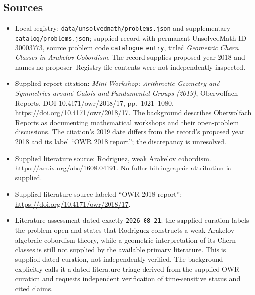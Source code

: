 \documentclass[11pt]{article}
\begin{document}
\subsection{Sources}
\begin{itemize}
\item Local registry: \texttt{data/unsolvedmath/problems.json} and supplementary \texttt{catalog/problems.json}; supplied record with permanent UnsolvedMath ID \(30003773\), source problem code \texttt{catalogue entry}, titled \emph{Geometric Chern Classes in Arakelov Cobordism}. The record supplies proposed year 2018 and names no proposer. Registry file contents were not independently inspected.
\item Supplied report citation: \emph{Mini-Workshop: Arithmetic Geometry and Symmetries around Galois and Fundamental Groups (2019)}, Oberwolfach Reports, DOI 10.4171/owr/2018/17, pp.~1021--1080. \url{https://doi.org/10.4171/owr/2018/17}. The background describes Oberwolfach Reports as documenting mathematical workshops and their open-problem discussions. The citation's 2019 date differs from the record's proposed year 2018 and its label ``OWR 2018 report''; the discrepancy is unresolved.
\item Supplied literature source: Rodriguez, weak Arakelov cobordism. \url{https://arxiv.org/abs/1608.04191}. No fuller bibliographic attribution is supplied.
\item Supplied literature source labeled ``OWR 2018 report'': \url{https://doi.org/10.4171/owr/2018/17}.
\item Literature assessment dated exactly \texttt{2026-08-21}: the supplied curation labels the problem open and states that Rodriguez constructs a weak Arakelov algebraic cobordism theory, while a geometric interpretation of its Chern classes is still not supplied by the available primary literature. This is supplied dated curation, not independently verified. The background explicitly calls it a dated literature triage derived from the supplied OWR curation and requests independent verification of time-sensitive status and cited claims.
\end{itemize}
\end{document}
